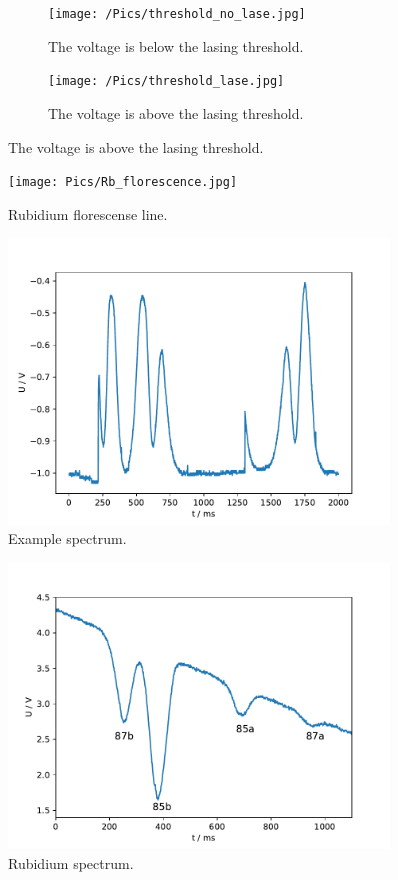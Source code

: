 


\begin{figure}
  \centering
  \begin{subfigure}{0.48\textwidth}
    \centering
    \texttt{[image: /Pics/threshold\_no\_lase.jpg]}
    \caption{The voltage is below the lasing threshold.}
    \label{fig:no_lase}
  \end{subfigure}
  \begin{subfigure}{0.48\textwidth}
    \centering
    \texttt{[image: /Pics/threshold\_lase.jpg]}
    \caption{The voltage is above the lasing threshold.}
    \label{fig:lase}
  \end{subfigure}
\end{figure}


\begin{figure}
  \centering
  \texttt{[image: Pics/Rb\_florescence.jpg]}
  \caption{Rubidium florescense line.}
  \label{fig:florescence}
\end{figure}

\begin{figure}
  \centering
  \includegraphics[width=0.9\textwidth]{Pics/example_spectrum.pdf}
  \caption{Example spectrum.}
  \label{fig:example}
\end{figure}

\begin{figure}
  \centering
  \includegraphics[width=0.9\textwidth]{Pics/Rb_spectrum.pdf}
  \caption{Rubidium spectrum.}
  \label{fig:spectrum}
\end{figure}

